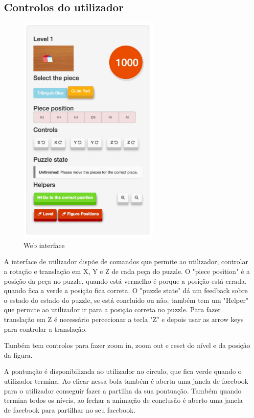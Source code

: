 \documentclass[pdftex,12pt,a4paper]{report}
\begin{document}
\subsection{Controlos do utilizador}

\begin{figure}[!htb]
\center
 \includegraphics[width=70mm,scale=1]{webuserinterface.pdf}
 \caption{Web interface}
 \label{fig:web_interface}
\end{figure}

A interface de utilizador dispõe de comandos que permite ao utilizador, controlar a rotação e translação em X, Y e Z de cada peça do puzzle. O "piece position" é a posição da peça no puzzle, quando está vermelho é porque a posição está errada, quando fica a verde a posição fica correta. O "puzzle state" dá um feedback sobre o estado do estado do puzzle, se está concluído ou não, também tem um "Helper" que permite ao utilizador ir para a posição correta no puzzle. Para fazer translação em Z é necessário percecionar a tecla "Z" e depois usar as arrow keys para controlar a translação.

Também tem controlos para fazer zoom in, zoom out e reset do nível e da posição da figura.

A pontuação é disponibilizada ao utilizador no círculo, que fica verde quando o utilizador termina. Ao clicar nessa bola também é aberta uma janela de facebook para o utilizador conseguir fazer a partilha da sua pontuação. Também quando termina todos os níveis, ao fechar a animação de conclusão é aberto uma janela de facebook para partilhar no seu facebook.
\end{document}
